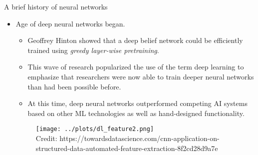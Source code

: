 \begin{vbframe}{A brief history of neural networks}
\begin{itemize}
\begin{itemize}
\footnotesize\item Overly optimistic expectations concerning potential of AI/DL.
\footnotesize\item The phrase \enquote{AI} even reached a pseudoscience status.
\footnotesize\item Kernel machines and graphical models both achieved good results on many important tasks.
\footnotesize\item Some fundamental mathematical difficulties in modeling long sequences were identified.
\end{itemize}
\begin{figure}
\texttt{[image: ../plots/ai\_winter.jpg]}
\\
\tiny{Credit: https://emerj.com/ai-executive-guides/will-there-be-another-artificial-intelligence-winter-probably-not/}
\end{figure}
\framebreak

\item {} Age of deep neural networks began.

\begin{itemize}
\footnotesize\item Geoffrey Hinton showed that a deep belief network could be efficiently trained using \textit{greedy layer-wise pretraining}.
\footnotesize\item This wave of research popularized the use of the term deep learning to emphasize that researchers were now able to train deeper neural networks than had been possible before.
\footnotesize\item At this time, deep neural networks outperformed competing AI systems based on other ML technologies as well as hand-designed functionality.
\end{itemize}
\begin{figure}
\texttt{[image: ../plots/dl\_feature2.png]}
\\
\tiny{Credit: https://towardsdatascience.com/cnn-application-on-structured-data-automated-feature-extraction-8f2cd28d9a7e}
\end{figure}
\end{itemize}
\framebreak


\end{vbframe}
